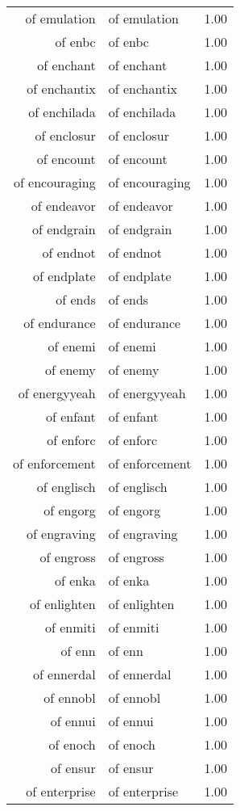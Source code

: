 \begin{table}[ht]
\begin{tabular}{rlr}
  of emulation & of emulation & 1.00 \\ 
  of enbc & of enbc & 1.00 \\ 
  of enchant & of enchant & 1.00 \\ 
  of enchantix & of enchantix & 1.00 \\ 
  of enchilada & of enchilada & 1.00 \\ 
  of enclosur & of enclosur & 1.00 \\ 
  of encount & of encount & 1.00 \\ 
  of encouraging & of encouraging & 1.00 \\ 
  of endeavor & of endeavor & 1.00 \\ 
  of endgrain & of endgrain & 1.00 \\ 
  of endnot & of endnot & 1.00 \\ 
  of endplate & of endplate & 1.00 \\ 
  of ends & of ends & 1.00 \\ 
  of endurance & of endurance & 1.00 \\ 
  of enemi & of enemi & 1.00 \\ 
  of enemy & of enemy & 1.00 \\ 
  of energyyeah & of energyyeah & 1.00 \\ 
  of enfant & of enfant & 1.00 \\ 
  of enforc & of enforc & 1.00 \\ 
  of enforcement & of enforcement & 1.00 \\ 
  of englisch & of englisch & 1.00 \\ 
  of engorg & of engorg & 1.00 \\ 
  of engraving & of engraving & 1.00 \\ 
  of engross & of engross & 1.00 \\ 
  of enka & of enka & 1.00 \\ 
  of enlighten & of enlighten & 1.00 \\ 
  of enmiti & of enmiti & 1.00 \\ 
  of enn & of enn & 1.00 \\ 
  of ennerdal & of ennerdal & 1.00 \\ 
  of ennobl & of ennobl & 1.00 \\ 
  of ennui & of ennui & 1.00 \\ 
  of enoch & of enoch & 1.00 \\ 
  of ensur & of ensur & 1.00 \\ 
  of enterprise & of enterprise & 1.00 \\ 

\end{tabular}
\end{table}
